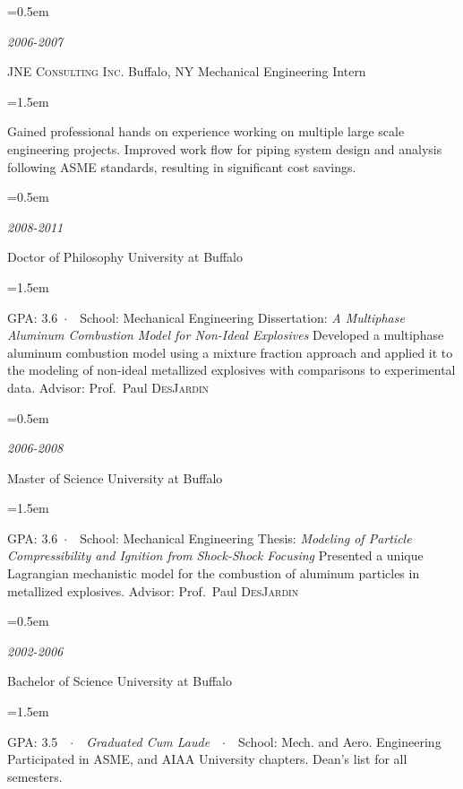 \documentclass{scrartcl}
\newlength{\datebox}\settowidth{\datebox}{Spring 2011} %
\newcommand{\NewDegree}[3]{\noindent\hangindent=0.5em\hangafter=0 \parbox{\datebox}{\small \textit{#1}}\hspace{1.5em} #2 \hfill #3 %
\vspace{0.5em}} %
\newcommand{\NewJob}[4]{\noindent\hangindent=0.5em\hangafter=0 \parbox{\datebox}{\small \textit{#1}}\hspace{1em} #2 \hfill #4 \newline #3 %
\vspace{0.5em}} %
\newcommand{\Description}[1]{\hangindent=1.5em\hangafter=0\noindent\raggedright\footnotesize{#1}\par\normalsize\vspace{0.75em}} %
\begin{document}
\begin{cv}{}
\NewJob{2006-2007}{\textsc{JNE Consulting Inc.}}{Mechanical Engineering Intern}{Buffalo, NY}

\Description{\justifying Gained professional hands on experience working on multiple large scale engineering projects.  Improved work flow for piping system design and analysis following ASME standards, resulting in significant cost savings.\par}

\vspace{0.5em} %


\vspace{0.5em}

\NewDegree{2008-2011}{Doctor of Philosophy}{University at Buffalo}

\Description{GPA: 3.6\ $\cdotp$\ \ School: Mechanical Engineering\newline 
Dissertation: \textit{A Multiphase Aluminum Combustion Model for Non-Ideal Explosives}\newline
Developed a multiphase aluminum combustion model using a mixture fraction approach and applied it to the modeling of non-ideal metallized explosives with comparisons to experimental data.\newline
Advisor: Prof.~Paul \textsc{DesJardin} }


\NewDegree{2006-2008}{Master of Science}{University at Buffalo}

\Description{GPA: 3.6\ $\cdotp$\ \ School: Mechanical Engineering\newline 
Thesis: \textit{Modeling of Particle Compressibility and Ignition from Shock-Shock Focusing}\newline
Presented a unique Lagrangian mechanistic model for the combustion of aluminum particles in metallized explosives.\newline
Advisor: Prof.~Paul \textsc{DesJardin} }


\NewDegree{2002-2006}{Bachelor of Science}{University at Buffalo}

\Description{GPA: 3.5\ \ $\cdotp$\ \ \textit{Graduated Cum Laude}\ \ $\cdotp$\ \ School: Mech. and Aero. Engineering\newline 
Participated in ASME, and AIAA University chapters.  Dean's list for all semesters.
}


\end{cv}
\end{document}
